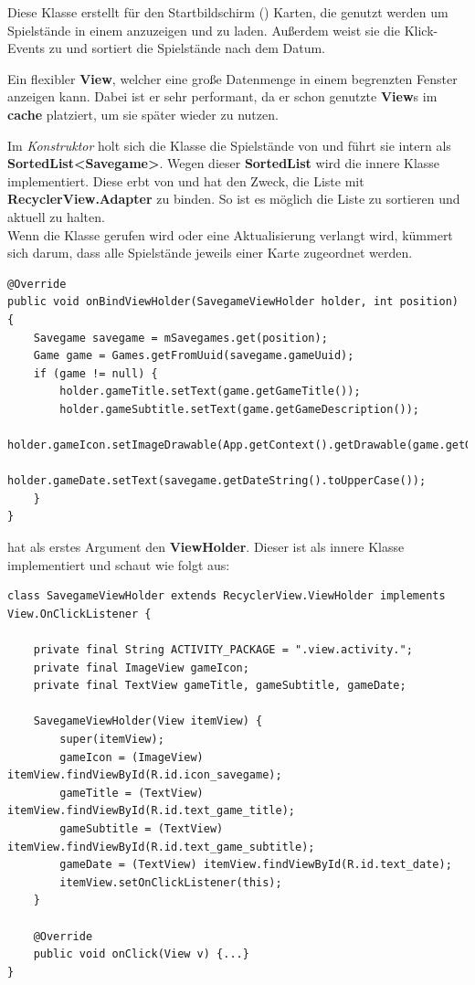 Diese Klasse erstellt für den Startbildschirm () Karten, die
genutzt werden um Spielstände in einem  anzuzeigen und zu
laden. Außerdem weist sie die Klick-Events zu und sortiert die Spielstände nach
dem Datum.

\begin{mdframed}[frametitle=Erklärung: RecyclerView]
Ein flexibler \textbf{View}, welcher eine große Datenmenge in einem begrenzten
Fenster anzeigen kann. Dabei ist er sehr performant, da er schon genutzte
\textbf{View}s im \textbf{cache} platziert, um sie später wieder zu nutzen. 
\end{mdframed}

Im \emph{Konstruktor} holt sich die Klasse die Spielstände von 
 und führt sie intern als \textbf{SortedList<Savegame>}.
Wegen dieser \textbf{SortedList} wird die innere Klasse
 implementiert. Diese erbt von
 und hat den Zweck, die Liste mit
\textbf{RecyclerView.Adapter} zu binden. So ist es möglich die Liste zu
sortieren und aktuell zu halten.\\

Wenn die Klasse gerufen wird oder eine Aktualisierung verlangt wird, kümmert
sich  darum, dass alle
Spielstände jeweils einer Karte zugeordnet werden.

\begin{lstlisting}[caption={SavegameAdapter onBindViewHolder() Methode},captionpos=b]
@Override
public void onBindViewHolder(SavegameViewHolder holder, int position) {
	Savegame savegame = mSavegames.get(position);
	Game game = Games.getFromUuid(savegame.gameUuid);
	if (game != null) {
		holder.gameTitle.setText(game.getGameTitle());
		holder.gameSubtitle.setText(game.getGameDescription());
		holder.gameIcon.setImageDrawable(App.getContext().getDrawable(game.getGameIconId()));
		holder.gameDate.setText(savegame.getDateString().toUpperCase());
	}
}
\end{lstlisting}

 hat als erstes Argument den \textbf{ViewHolder}.
Dieser ist als innere Klasse implementiert und schaut wie folgt aus:

\begin{lstlisting}[caption={SavegameAdapter SavegameViewHolder Klasse},captionpos=b]
class SavegameViewHolder extends RecyclerView.ViewHolder implements View.OnClickListener {

	private final String ACTIVITY_PACKAGE = ".view.activity.";
	private final ImageView gameIcon;
	private final TextView gameTitle, gameSubtitle, gameDate;

	SavegameViewHolder(View itemView) {
		super(itemView);
		gameIcon = (ImageView) itemView.findViewById(R.id.icon_savegame);
		gameTitle = (TextView) itemView.findViewById(R.id.text_game_title);
		gameSubtitle = (TextView) itemView.findViewById(R.id.text_game_subtitle);
		gameDate = (TextView) itemView.findViewById(R.id.text_date);
		itemView.setOnClickListener(this);
	}

	@Override
	public void onClick(View v) {...}
}
\end{lstlisting}

